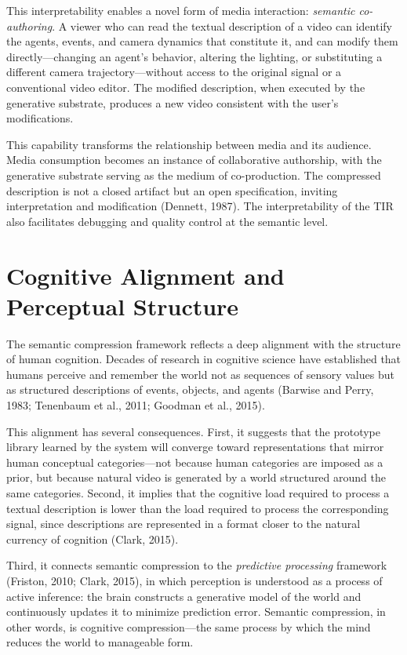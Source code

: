 \documentclass[11pt,a4paper]{article}
\theoremstyle{definition}
\theoremstyle{remark}
\begin{document}
This interpretability enables a novel form of media interaction: \emph{semantic co-authoring}. A viewer who can read the textual description of a video can identify the agents, events, and camera dynamics that constitute it, and can modify them directly---changing an agent's behavior, altering the lighting, or substituting a different camera trajectory---without access to the original signal or a conventional video editor. The modified description, when executed by the generative substrate, produces a new video consistent with the user's modifications.

This capability transforms the relationship between media and its audience. Media consumption becomes an instance of collaborative authorship, with the generative substrate serving as the medium of co-production. The compressed description is not a closed artifact but an open specification, inviting interpretation and modification (Dennett, 1987). The interpretability of the TIR also facilitates debugging and quality control at the semantic level.

\section{Cognitive Alignment and Perceptual Structure}
\label{sec:cognitive}

The semantic compression framework reflects a deep alignment with the structure of human cognition. Decades of research in cognitive science have established that humans perceive and remember the world not as sequences of sensory values but as structured descriptions of events, objects, and agents (Barwise and Perry, 1983; Tenenbaum et al., 2011; Goodman et al., 2015).

This alignment has several consequences. First, it suggests that the prototype library learned by the system will converge toward representations that mirror human conceptual categories---not because human categories are imposed as a prior, but because natural video is generated by a world structured around the same categories. Second, it implies that the cognitive load required to process a textual description is lower than the load required to process the corresponding signal, since descriptions are represented in a format closer to the natural currency of cognition (Clark, 2015).

Third, it connects semantic compression to the \emph{predictive processing} framework (Friston, 2010; Clark, 2015), in which perception is understood as a process of active inference: the brain constructs a generative model of the world and continuously updates it to minimize prediction error. Semantic compression, in other words, is cognitive compression---the same process by which the mind reduces the world to manageable form.
\end{document}

